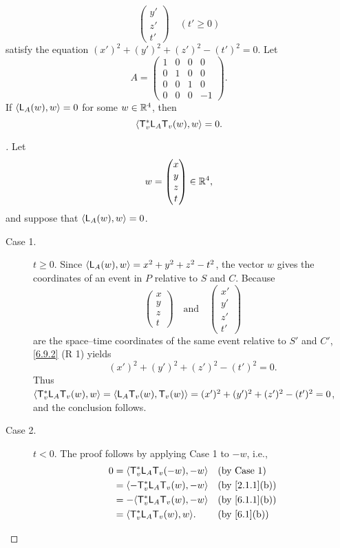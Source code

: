 \begin{thm}
\[\begin{pmatrix}
      y' \\
      z' \\
      t'
    \end{pmatrix} \quad (t' \geq 0)
  \]
  satisfy the equation \((x')^2 + (y')^2 + (z')^2 - (t')^2 = 0\).
  Let
  \[
    A = \begin{pmatrix}
      1 & 0 & 0 & 0  \\
      0 & 1 & 0 & 0  \\
      0 & 0 & 1 & 0  \\
      0 & 0 & 0 & -1
    \end{pmatrix}.
  \]
  If \(\left\langle\mathsf{L}_A(w), w\right\rangle = 0\) for some \(w \in \mathbb{R}^4\), then
  \[
    \left\langle\mathsf{T}_v^* \mathsf{L}_A \mathsf{T}_v(w), w\right\rangle = 0.
  \]
\end{thm}

\begin{proof}[]
  Let
  \[
    w = \begin{pmatrix}
      x \\
      y \\
      z \\
      t
    \end{pmatrix} \in \mathbb{R}^4,
  \]
  and suppose that \(\left\langle\mathsf{L}_A(w), w\right\rangle = 0\).
  \begin{description}
    \item[Case 1.]
      \(t \geq 0\).
      Since \(\left\langle\mathsf{L}_A(w), w\right\rangle = x^2 + y^2 + z^2 - t^2\), the vector \(w\) gives the coordinates of an event in \(P\) relative to \(S\) and \(C\).
      Because
      \[
        \begin{pmatrix}
          x \\
          y \\
          z \\
          t
        \end{pmatrix} \quad \text{and} \quad \begin{pmatrix}
          x' \\
          y' \\
          z' \\
          t'
        \end{pmatrix}
      \]
      are the space--time coordinates of the same event relative to \(S'\) and \(C'\), \cref{6.9.2} (R 1) yields
      \[
        (x')^2 + (y')^2 + (z')^2 - (t')^2 = 0.
      \]
      Thus \(\left\langle\mathsf{T}_v^* \mathsf{L}_A \mathsf{T}_v(w), w\right\rangle = \left\langle\mathsf{L}_A \mathsf{T}_v(w), \mathsf{T}_v(w)\right\rangle = (x')^2 + (y')^2 + (z')^2 - (t')^2 = 0\), and the conclusion follows.
    \item[Case 2.]
      \(t < 0\).
      The proof follows by applying Case 1 to \(-w\), i.e.,
      \begin{align*}
        0 & = \inn{\T_v^* \L_A \T_v(-w), -w} &  & \text{(by Case 1)} \\
          & = \inn{-\T_v^* \L_A \T_v(w), -w} &  & \by{2.1.1}[b]      \\
          & = -\inn{\T_v^* \L_A \T_v(w), -w} &  & \by{6.1.1}[b]      \\
          & = \inn{\T_v^* \L_A \T_v(w), w}.  &  & \by{6.1}[b]
      \end{align*}
  \end{description}
\end{proof}

